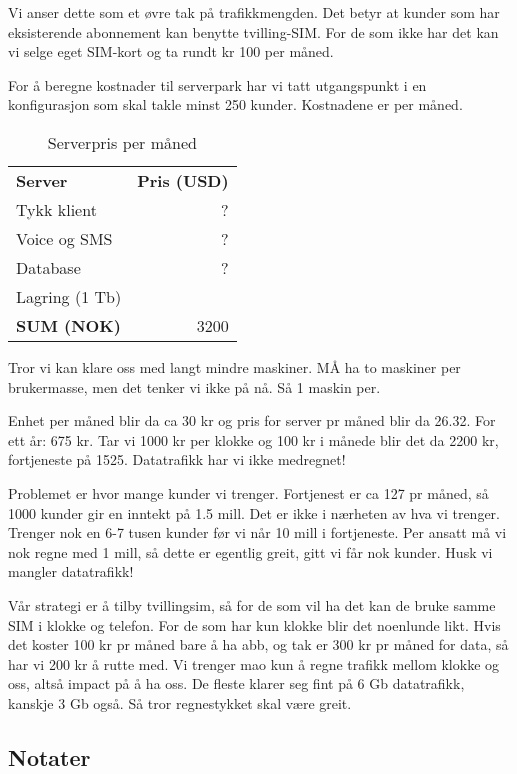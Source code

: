 Vi anser dette som et øvre tak på trafikkmengden. Det betyr at kunder som har
eksisterende abonnement kan benytte tvilling-SIM. For de som ikke har det kan
vi selge eget SIM-kort og ta rundt kr 100 per måned.

%
For å beregne kostnader til serverpark har vi tatt utgangspunkt i en
konfigurasjon som skal takle minst 250 kunder. Kostnadene er per måned.

\begin{table}[h]
  \centering
  \begin{tabular}{lr}
  \textbf{Server}      & \textbf{Pris (USD)} \\
  Tykk klient       & ? \\
  Voice og SMS      & ? \\
  Database          & ? \\
  Lagring (1 Tb)    & \\
  \textbf{SUM (NOK)} & 3200 \\
  \end{tabular}
  \caption{Serverpris per måned}
  \label{table.serverpris}
\end{table}

Tror vi kan klare oss med langt mindre maskiner. MÅ ha to maskiner per
brukermasse, men det tenker vi ikke på nå. Så 1 maskin per.

Enhet per måned blir da ca 30 kr og pris for server pr måned blir da 26.32.
For ett år: 675 kr. Tar vi 1000 kr per klokke og 100 kr i månede blir det da
2200 kr, fortjeneste på 1525. Datatrafikk har vi ikke medregnet!

Problemet er hvor mange kunder vi trenger. Fortjenest er ca 127 pr måned, så
1000 kunder gir en inntekt på 1.5 mill. Det er ikke i nærheten av hva vi
trenger. Trenger nok en 6-7 tusen kunder før vi når 10 mill i fortjeneste.
Per ansatt må vi nok regne med 1 mill, så dette er egentlig greit, gitt vi får
nok kunder. Husk vi mangler datatrafikk!

Vår strategi er å tilby tvillingsim, så for de som vil ha det kan de bruke
samme SIM i klokke og telefon. For de som har kun klokke blir det noenlunde
likt. Hvis det koster 100 kr pr måned bare å ha abb, og tak er 300 kr pr måned
for data, så har vi 200 kr å rutte med. Vi trenger mao kun å regne trafikk
mellom klokke og oss, altså impact på å ha oss. De fleste klarer seg fint på 6
Gb datatrafikk, kanskje 3 Gb også. Så tror regnestykket skal være greit.

\subsection{Notater}

